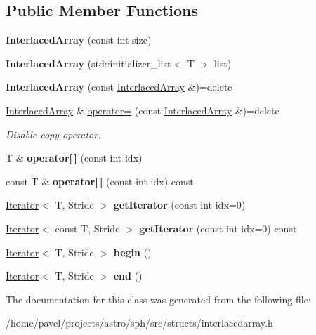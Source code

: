 \subsection*{Public Member Functions}
\begin{DoxyCompactItemize}
\item 
\hypertarget{classInterlacedArray_a55777575fd812053aa3a8a80df5241d7}{}\label{classInterlacedArray_a55777575fd812053aa3a8a80df5241d7} 
{\bfseries Interlaced\+Array} (const int size)
\item 
\hypertarget{classInterlacedArray_aedc3a9f0725d6040e3a92d68652d2667}{}\label{classInterlacedArray_aedc3a9f0725d6040e3a92d68652d2667} 
{\bfseries Interlaced\+Array} (std\+::initializer\+\_\+list$<$ T $>$ list)
\item 
\hypertarget{classInterlacedArray_adfa8e67bd0e3a1d1a42a9d3d310ea7d5}{}\label{classInterlacedArray_adfa8e67bd0e3a1d1a42a9d3d310ea7d5} 
{\bfseries Interlaced\+Array} (const \hyperlink{classInterlacedArray}{Interlaced\+Array} \&)=delete
\item 
\hypertarget{classInterlacedArray_a4b822c312c603c62b6ba93911cc2330c}{}\label{classInterlacedArray_a4b822c312c603c62b6ba93911cc2330c} 
\hyperlink{classInterlacedArray}{Interlaced\+Array} \& \hyperlink{classInterlacedArray_a4b822c312c603c62b6ba93911cc2330c}{operator=} (const \hyperlink{classInterlacedArray}{Interlaced\+Array} \&)=delete
\begin{DoxyCompactList}\small\item\em Disable copy operator. \end{DoxyCompactList}\item 
\hypertarget{classInterlacedArray_a1ca26d114618ac8b0c54a6492d21b676}{}\label{classInterlacedArray_a1ca26d114618ac8b0c54a6492d21b676} 
T \& {\bfseries operator\mbox{[}$\,$\mbox{]}} (const int idx)
\item 
\hypertarget{classInterlacedArray_a75b8c54b08ab3a3ec090b551388b296a}{}\label{classInterlacedArray_a75b8c54b08ab3a3ec090b551388b296a} 
const T \& {\bfseries operator\mbox{[}$\,$\mbox{]}} (const int idx) const
\item 
\hypertarget{classInterlacedArray_a2d1dbe3c4185f970af7abd7a20444b52}{}\label{classInterlacedArray_a2d1dbe3c4185f970af7abd7a20444b52} 
\hyperlink{classIterator}{Iterator}$<$ T, Stride $>$ {\bfseries get\+Iterator} (const int idx=0)
\item 
\hypertarget{classInterlacedArray_a6eb3598b7634dda6b71a38755f5d7d6b}{}\label{classInterlacedArray_a6eb3598b7634dda6b71a38755f5d7d6b} 
\hyperlink{classIterator}{Iterator}$<$ const T, Stride $>$ {\bfseries get\+Iterator} (const int idx=0) const
\item 
\hypertarget{classInterlacedArray_a9cab983f99d9cc029271b9ce725f8b17}{}\label{classInterlacedArray_a9cab983f99d9cc029271b9ce725f8b17} 
\hyperlink{classIterator}{Iterator}$<$ T, Stride $>$ {\bfseries begin} ()
\item 
\hypertarget{classInterlacedArray_a9c64795449a79dddca2b159d98a5824e}{}\label{classInterlacedArray_a9c64795449a79dddca2b159d98a5824e} 
\hyperlink{classIterator}{Iterator}$<$ T, Stride $>$ {\bfseries end} ()
\end{DoxyCompactItemize}


The documentation for this class was generated from the following file\+:\begin{DoxyCompactItemize}
\item 
/home/pavel/projects/astro/sph/src/structs/interlacedarray.\+h\end{DoxyCompactItemize}
